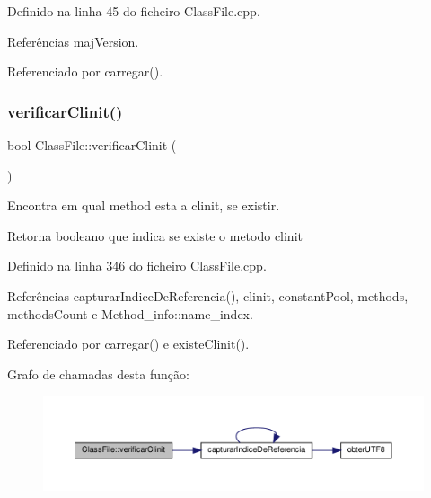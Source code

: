 Definido na linha 45 do ficheiro Class\+File.\+cpp.



Referências maj\+Version.



Referenciado por carregar().

\mbox{\label{classClassFile_ab0394185a299f35a9b5be68143385e84}} 
\subsubsection{\texorpdfstring{verificar\+Clinit()}{verificarClinit()}}
{\footnotesize\ttfamily bool Class\+File\+::verificar\+Clinit (\begin{DoxyParamCaption}{ }\end{DoxyParamCaption})\hspace{0.3cm}{\ttfamily [private]}}



Encontra em qual method esta a clinit, se existir. 

\begin{DoxyReturn}{Retorna}
booleano que indica se existe o metodo clinit 
\end{DoxyReturn}


Definido na linha 346 do ficheiro Class\+File.\+cpp.



Referências capturar\+Indice\+De\+Referencia(), clinit, constant\+Pool, methods, methods\+Count e Method\+\_\+info\+::name\+\_\+index.



Referenciado por carregar() e existe\+Clinit().

Grafo de chamadas desta função\+:
\nopagebreak
\begin{figure}[H]
\begin{center}
\leavevmode
\includegraphics[width=350pt]{classClassFile_ab0394185a299f35a9b5be68143385e84_cgraph}
\end{center}
\end{figure}
\mbox{\label{classClassFile_ae8e4445e763c4ee7c04995fcea0369e0}} 
